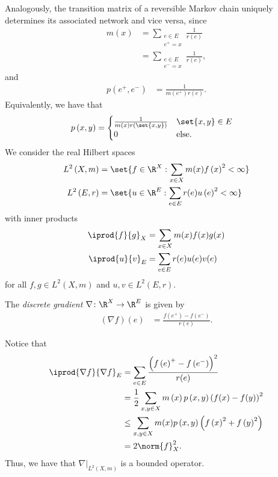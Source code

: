 \documentclass[10pt]{mypackage}
\begin{document}
Analogously, the transition matrix of a reversible Markov chain uniquely determines its associated network and vice versa, since
\begin{align*}
  m\left( x \right) &= \sum_{\substack{e\in E \\ e^+ = x}}\frac{1}{r(e)}\\
                    &= \sum_{\substack{e\in E \\ e^- = x}} \frac{1}{r(e)},
\end{align*}
and
\begin{align*}
  p\left( e^+,e^- \right) &= \frac{1}{m\left( e^+ \right)r(e)}.
\end{align*}
Equivalently, we have that
\begin{align*}
  p\left( x,y \right) &= \begin{cases}
    \frac{1}{m(x)r\left( \set{x,y} \right)} & \set{x,y}\in E\\
    0 & \text{else}.
  \end{cases}
\end{align*}
We consider the real Hilbert spaces
\begin{align*}
  L^2\left( X,m \right) &= \set{f\in \R^X : \sum_{x\in X}m(x)f\left( x \right)^2 < \infty}\\
  L^2\left( E,r \right) &= \set{u\in \R^{E} : \sum_{e\in E}r(e)u\left( e \right)^2 < \infty}
\end{align*}
with inner products
\begin{align*}
  \iprod{f}{g}_X &= \sum_{x\in X} m(x)f(x)g(x)\\
  \iprod{u}{v}_E &= \sum_{e\in E} r(e)u(e)v(e)
\end{align*}
for all $f,g\in L^2\left( X,m \right)$ and $u,v\in L^2\left( E,r \right)$.
\begin{definition}
  The \textit{discrete gradient} $\nabla\colon \R^X\to \R^E$ is given by
  \begin{align*}
    \left( \nabla f \right)(e) &= \frac{f\left(e^+\right) - f\left( e^- \right)}{r(e)}.
  \end{align*}
\end{definition}
Notice that
\begin{align*}
  \iprod{\nabla f}{\nabla f}_E &= \sum_{e\in E} \frac{\left( f\left( e \right)^+ - f\left( e^- \right) \right)^2}{r(e)}\\
                               &= \frac{1}{2}\sum_{x,y\in X} m\left( x \right)p\left( x,y \right)\left( f(x)-f(y) \right)^2\\
                               &\leq \sum_{x,y\in X}m(x)p\left( x,y \right)\left( f\left( x \right)^2 + f\left( y \right)^2 \right)\\
                               &= 2\norm{f}_X^2.
\end{align*}
Thus, we have that $\nabla|_{L^2\left( X,m \right)}$ is a bounded operator.
\end{document}

